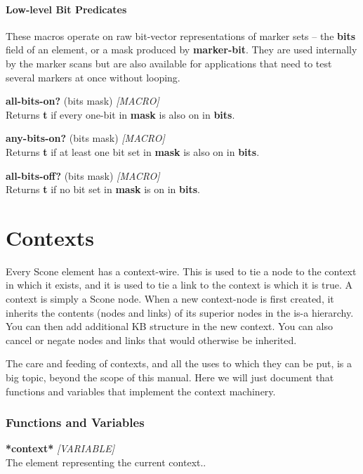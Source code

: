 \documentclass[titlepage,twoside,openright,11pt]{article}
\begin{document}
\paragraph{Low-level Bit Predicates}\label{low-level-bit-predicates}

These macros operate on raw bit-vector representations of marker sets
-- the \textbf{bits} field of an element, or a mask produced by
\textbf{marker-bit}. They are used internally by the marker scans but
are also available for applications that need to test several markers
at once without looping.

\textbf{all-bits-on?} (bits mask) \emph{{[}MACRO{]}}\\
Returns \textbf{t} if every one-bit in \textbf{mask} is also on in
\textbf{bits}.

\textbf{any-bits-on?} (bits mask) \emph{{[}MACRO{]}}\\
Returns \textbf{t} if at least one bit set in \textbf{mask} is also on
in \textbf{bits}.

\textbf{all-bits-off?} (bits mask) \emph{{[}MACRO{]}}\\
Returns \textbf{t} if no bit set in \textbf{mask} is on in
\textbf{bits}.

\section{Contexts}\label{contexts}

Every Scone element has a context-wire. This is used to tie a node to
the context in which it exists, and it is used to tie a link to the
context is which it is true. A context is simply a Scone node. When a
new context-node is first created, it inherits the contents (nodes and
links) of its superior nodes in the is-a hierarchy. You can then add
additional KB structure in the new context. You can also cancel or
negate nodes and links that would otherwise be inherited.

The care and feeding of contexts, and all the uses to which they can be
put, is a big topic, beyond the scope of this manual. Here we will just
document that functions and variables that implement the context
machinery.

\subsubsection{Functions and Variables}\label{functions-and-variables-5}

\textbf{*context*} \emph{{[}VARIABLE{]}}\\
The element representing the current context..
\end{document}
